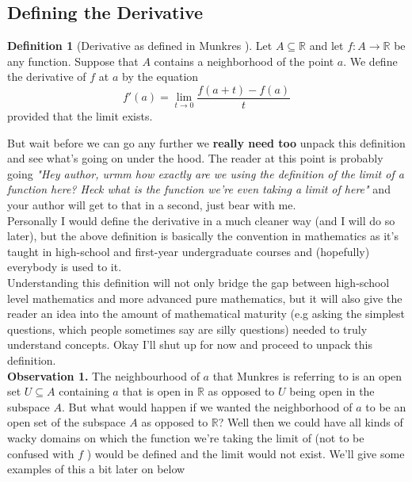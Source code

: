 \documentclass[12pt]{article}
\theoremstyle{definition}
\newtheorem{definition}{Definition}[section]
\numberwithin{definition}{subsection}
\numberwithin{theorem}{subsection}
\numberwithin{corollary}{subsection}
\numberwithin{example}{subsection}
\theoremstyle{remark}
\theoremstyle{point}
\begin{document}
	\subsection{Defining the Derivative}
	
	
	\begin{definition}[Derivative as defined in Munkres \cite{munkres2018analysis}]
		Let $A \subseteq \mathbb{R}$ and let $f : A \to \mathbb{R}$ be any function. Suppose that $A$ contains a neighborhood of the point $a$. We define the derivative of $f$ at $a$ by the equation $$f'(a) = \lim_{t \to 0} \frac{f(a+t) - f(a)}{t}$$ provided that the limit exists.
	\end{definition}
	
	But wait before we can go any further we \textbf{really need too} unpack this definition and see what's going on under the hood. The reader at this point is probably going \textit{"Hey author, urmm how exactly are we using the definition of the limit of a function here? Heck what is the function we're even taking a limit of here"} and your author will get to that in a second, just bear with me. \\
		
	Personally I would define the derivative in a much cleaner way (and I will do so later), but the above definition is basically the convention in mathematics as it's taught in high-school and first-year undergraduate courses and (hopefully) everybody is used to it. \\
		
	Understanding this definition will not only bridge the gap between high-school level mathematics and more advanced pure mathematics, but it will also give the reader an idea into the amount of mathematical maturity (e.g asking the simplest questions, which people sometimes say are silly questions) needed to truly understand concepts. Okay I'll shut up for now and proceed to unpack this definition. \\
	
	\textbf{Observation 1.}  The neighbourhood of $a$ that Munkres is referring to is an open set $U \subseteq A$  containing $a$ that is open in $\mathbb{R}$ as opposed to $U$ being open in the subspace $A$. But what would happen if we wanted the neighborhood of $a$ to be an open set of the subspace $A$ as opposed to $\mathbb{R}$? Well then we could have all kinds of wacky domains on which the function  we're taking the limit of (not to be confused with $f$ ) would be defined and the limit would not exist. We'll give some examples of this a bit later on below \\
	
\end{document}
